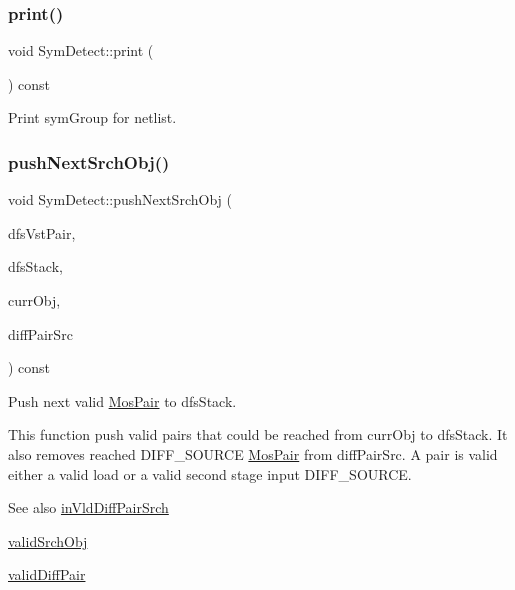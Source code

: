 \subsubsection{\texorpdfstring{print()}{print()}}
{\footnotesize\ttfamily void Sym\+Detect\+::print (\begin{DoxyParamCaption}{ }\end{DoxyParamCaption}) const}



Print sym\+Group for netlist. 

\mbox{\label{classSymDetect_a7f4cd1010a21da88d35abb89c6f33f00}} 
\subsubsection{\texorpdfstring{push\+Next\+Srch\+Obj()}{pushNextSrchObj()}}
{\footnotesize\ttfamily void Sym\+Detect\+::push\+Next\+Srch\+Obj (\begin{DoxyParamCaption}\item[{std\+::vector$<$ \hyperlink{classMosPair}{Mos\+Pair} $>$ \&}]{dfs\+Vst\+Pair,  }\item[{std\+::vector$<$ \hyperlink{classMosPair}{Mos\+Pair} $>$ \&}]{dfs\+Stack,  }\item[{\hyperlink{classMosPair}{Mos\+Pair} \&}]{curr\+Obj,  }\item[{std\+::vector$<$ \hyperlink{classMosPair}{Mos\+Pair} $>$ \&}]{diff\+Pair\+Src }\end{DoxyParamCaption}) const\hspace{0.3cm}{\ttfamily [private]}}



Push next valid \hyperlink{classMosPair}{Mos\+Pair} to dfs\+Stack. 

This function push valid pairs that could be reached from curr\+Obj to dfs\+Stack. It also removes reached D\+I\+F\+F\+\_\+\+S\+O\+U\+R\+CE \hyperlink{classMosPair}{Mos\+Pair} from diff\+Pair\+Src. A pair is valid either a valid load or a valid second stage input D\+I\+F\+F\+\_\+\+S\+O\+U\+R\+CE.

\begin{DoxySeeAlso}{See also}
\hyperlink{classSymDetect_ae6a1ba27f6768f215cba0623b6e2ce08}{in\+Vld\+Diff\+Pair\+Srch} 

\hyperlink{classSymDetect_ad4636f69ae0cad2fc23be2472c59ff4c}{valid\+Srch\+Obj} 

\hyperlink{classSymDetect_a1153c5f98df1f6dde97ed3335367bb66}{valid\+Diff\+Pair} 
\end{DoxySeeAlso}

